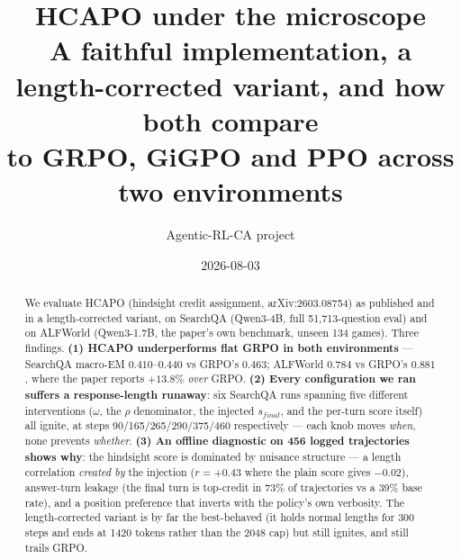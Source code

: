 \documentclass[11pt]{article}
\title{\textbf{HCAPO under the microscope}\\[3pt]
\large A faithful implementation, a length-corrected variant, and how both compare\\
to GRPO, GiGPO and PPO across two environments}
\author{Agentic-RL-CA project}
\date{2026-08-03}
\begin{document}
\maketitle

\begin{abstract}
\noindent We evaluate HCAPO (hindsight credit assignment, arXiv:2603.08754) as published and in a
length-corrected variant, on SearchQA (Qwen3-4B, full 51{,}713-question eval) and on ALFWorld
(Qwen3-1.7B, the paper's own benchmark, unseen 134 games). Three findings. \textbf{(1) HCAPO
underperforms flat GRPO in both environments} --- SearchQA macro-EM $0.410$--$0.440$ vs GRPO's
$0.463$; ALFWorld $0.784$ vs GRPO's $0.881$, where the paper reports $+13.8\%$ \emph{over} GRPO.
\textbf{(2) Every configuration we ran suffers a response-length runaway}: six SearchQA runs
spanning five different interventions ($\omega$, the $\rho$ denominator, the injected $s_{final}$,
and the per-turn score itself) all ignite, at steps 90/165/265/290/375/460 respectively --- each
knob moves \emph{when}, none prevents \emph{whether}. \textbf{(3) An offline diagnostic on 456
logged trajectories shows why}: the hindsight score is dominated by nuisance structure --- a length
correlation \emph{created by} the injection ($r{=}{+}0.43$ where the plain score gives $-0.02$),
answer-turn leakage (the final turn is top-credit in 73\% of trajectories vs a 39\% base rate), and
a position preference that inverts with the policy's own verbosity. The length-corrected variant is
by far the best-behaved (it holds normal lengths for 300 steps and ends at 1420 tokens rather than
the 2048 cap) but still ignites, and still trails GRPO.
\end{abstract}
\end{document}
